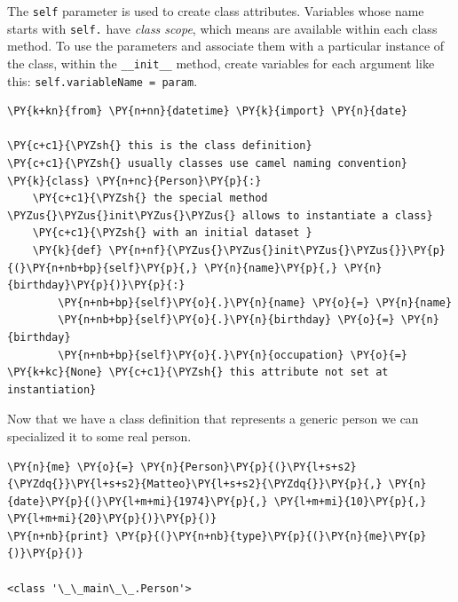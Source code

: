 The \texttt{self} parameter is used to create class attributes. Variables
whose name starts with \texttt{self.} have \emph{class scope}, which means are
available within each class method. To use the parameters and
associate them with a particular instance of the class, within the
\texttt{\_\_init\_\_} method, create variables for each argument like
this: \texttt{self.variableName\ =\ param}.

\begin{codebox}[breakable, size=fbox, boxrule=1pt, pad at break*=1mm,colback=cellbackground, colframe=cellborder]
\begin{Verbatim}[commandchars=\\\{\}]
\PY{k+kn}{from} \PY{n+nn}{datetime} \PY{k}{import} \PY{n}{date}

\PY{c+c1}{\PYZsh{} this is the class definition}
\PY{c+c1}{\PYZsh{} usually classes use camel naming convention}
\PY{k}{class} \PY{n+nc}{Person}\PY{p}{:}
    \PY{c+c1}{\PYZsh{} the special method \PYZus{}\PYZus{}init\PYZus{}\PYZus{} allows to instantiate a class}
    \PY{c+c1}{\PYZsh{} with an initial dataset }
    \PY{k}{def} \PY{n+nf}{\PYZus{}\PYZus{}init\PYZus{}\PYZus{}}\PY{p}{(}\PY{n+nb+bp}{self}\PY{p}{,} \PY{n}{name}\PY{p}{,} \PY{n}{birthday}\PY{p}{)}\PY{p}{:}
        \PY{n+nb+bp}{self}\PY{o}{.}\PY{n}{name} \PY{o}{=} \PY{n}{name}
        \PY{n+nb+bp}{self}\PY{o}{.}\PY{n}{birthday} \PY{o}{=} \PY{n}{birthday}     
        \PY{n+nb+bp}{self}\PY{o}{.}\PY{n}{occupation} \PY{o}{=} \PY{k+kc}{None} \PY{c+c1}{\PYZsh{} this attribute not set at instantiation}
\end{Verbatim}
\end{codebox}

Now that we have a class definition that represents a generic person we can 
specialized it to some real person.

\begin{codebox}[breakable, size=fbox, boxrule=1pt, pad at break*=1mm,colback=cellbackground, colframe=cellborder]
\begin{Verbatim}[commandchars=\\\{\}]
\PY{n}{me} \PY{o}{=} \PY{n}{Person}\PY{p}{(}\PY{l+s+s2}{\PYZdq{}}\PY{l+s+s2}{Matteo}\PY{l+s+s2}{\PYZdq{}}\PY{p}{,} \PY{n}{date}\PY{p}{(}\PY{l+m+mi}{1974}\PY{p}{,} \PY{l+m+mi}{10}\PY{p}{,} \PY{l+m+mi}{20}\PY{p}{)}\PY{p}{)}
\PY{n+nb}{print} \PY{p}{(}\PY{n+nb}{type}\PY{p}{(}\PY{n}{me}\PY{p}{)}\PY{p}{)}

<class '\_\_main\_\_.Person'>
\end{Verbatim}
\end{codebox}

